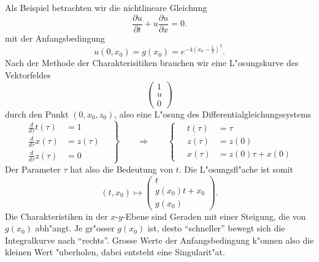 Als Beispiel betrachten wir die nichtlineare Gleichung 
\begin{equation}
\frac{\partial u}{\partial t}+u\frac{\partial u}{\partial x}=0.
\label{wellenichtlinear}
\end{equation}
mit der Anfangsbedingung 
\[
u(0,x_0)=g(x_0)=e^{-4(x_0-\frac12)^2}.
\]
Nach der Methode der Charakterisitiken brauchen wir eine L"osungskurve
des Vektorfeldes
\[
\begin{pmatrix}
1\\
u\\
0
\end{pmatrix}
\]
durch den Punkt $(0,x_0, z_0)$, also eine L"osung des Differentialgleichungssystems
\[
\left.
\begin{aligned}
\frac{d}{d\tau} t(\tau)&=1\\
\frac{d}{d\tau} x(\tau)&=z(\tau)\\
\frac{d}{d\tau} z(\tau)&=0
\end{aligned}
\quad
\right\}
\qquad
\Rightarrow
\qquad
\left\{
\quad
\begin{aligned}
t(\tau)&=\tau\\
z(\tau)&=z(0)\\
x(\tau)&=z(0)\tau +x(0)
\end{aligned}
\right.
\]
Der Parameter $\tau$ hat also die Bedeutung von $t$.
Die L"osungsfl"ache ist somit
\[
(t,x_0)\mapsto
\begin{pmatrix}
t\\
g(x_0)t+x_0\\
g(x_0)
\end{pmatrix}.
\]
Die Charakteristiken in der $x$-$y$-Ebene sind Geraden mit einer
Steigung, die von $g(x_0)$ abh"angt. Je gr"osser $g(x_0)$ ist, desto
``schneller'' bewegt sich die Integralkurve nach ``rechts''. Grosse
Werte der Anfangsbedingung k"onnen also die kleinen Wert "uberholen,
dabei entsteht eine Singularit"at.

